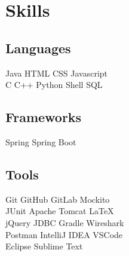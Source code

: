 \documentclass[]{deedy-resume-openfont}
\begin{document}
%
%
\lastupdated

%
%

%
%

\begin{minipage}[t]{0.33\textwidth} 


\section{Skills}
\subsection{Languages}
Java \textbullet{} HTML \textbullet{} CSS \textbullet{} Javascript \\
\textbullet{} C \textbullet{} C++ \textbullet{} Python 
\textbullet{} Shell \textbullet{} SQL \\

\subsection{Frameworks}
Spring \textbullet{} Spring Boot\\

\subsection{Tools}
Git \textbullet{} GitHub  \textbullet{} GitLab  \textbullet{} Mockito \\ \textbullet{} JUnit \textbullet{} Apache Tomcat  \textbullet{} LaTeX \\ \textbullet{} jQuery \textbullet{} JDBC \textbullet{} Gradle \textbullet{} Wireshark \\ \textbullet{} Postman\textbullet{} IntelliJ IDEA \textbullet{} VSCode \\ \textbullet{} Eclipse \textbullet{} Sublime Text
\sectionsep


\end{minipage}
\end{document}
